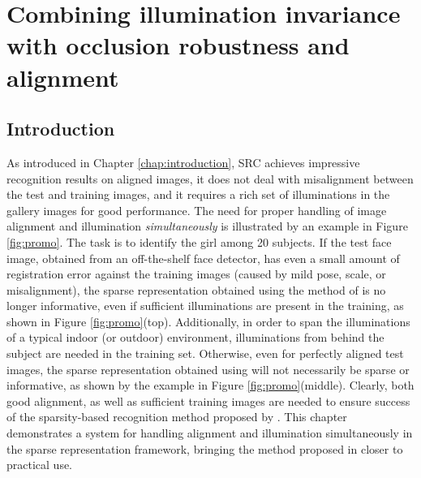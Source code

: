 \chapter{Combining illumination invariance with occlusion robustness and alignment}
\label{chap:pipeline}

\section{Introduction}
%

As introduced in Chapter \ref{chap:introduction}, SRC \cite{Wright2009-PAMI} 
achieves impressive recognition results on aligned images,
it does not deal with misalignment between the test and training
images, and it requires a rich set of illuminations in the gallery images for
good performance.  The need for proper handling of image alignment and
illumination {\em simultaneously} is illustrated by an example in Figure \ref{fig:promo}.  
The task is to
identify the girl among 20 subjects. If the test face image, obtained from
an off-the-shelf face detector, has even a small amount of registration error
against the training images (caused by mild pose, scale, or misalignment), the
sparse representation obtained using the method of \cite{Wright2009-PAMI} is no
longer informative, even if sufficient illuminations are present in the
training, as shown in Figure \ref{fig:promo}(top). Additionally, in order to
span the illuminations of a typical indoor (or outdoor) environment,
illuminations from behind the subject are needed in the training set.
Otherwise, even for perfectly aligned test images, the sparse representation
obtained using \cite{Wright2009-PAMI} will not necessarily be sparse or
informative, as shown by the example in Figure \ref{fig:promo}(middle).
Clearly, both good alignment, as well as sufficient training images are needed
to ensure success of the sparsity-based recognition method proposed by
\cite{Wright2009-PAMI}.  This chapter demonstrates a system for handling alignment
and illumination simultaneously in the sparse representation framework,
bringing the method proposed in \cite{Wright2009-PAMI} closer to practical use.

